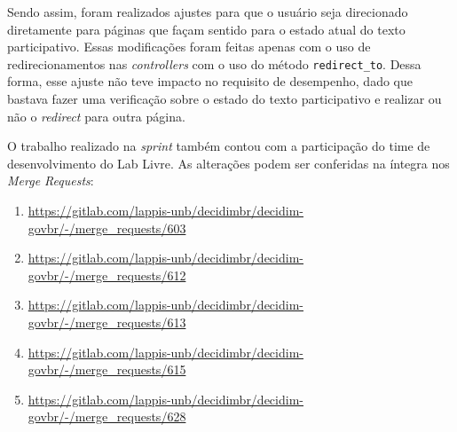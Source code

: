 Sendo assim, foram realizados ajustes para que o usuário seja direcionado diretamente para páginas que façam sentido para o estado atual do texto participativo. Essas modificações foram feitas apenas com o uso de redirecionamentos nas \textit{controllers} com o uso do método \texttt{redirect\_to}.
Dessa forma, esse ajuste não teve impacto no requisito de desempenho, dado que bastava fazer uma verificação sobre o estado do texto participativo e realizar ou não o \textit{redirect} para outra página.

O trabalho realizado na \textit{sprint} também contou com a participação do time de desenvolvimento do Lab Livre. As alterações podem ser conferidas na íntegra nos \textit{Merge Requests}:

\begin{enumerate}
  \item \url{https://gitlab.com/lappis-unb/decidimbr/decidim-govbr/-/merge_requests/603}
  \item \url{https://gitlab.com/lappis-unb/decidimbr/decidim-govbr/-/merge_requests/612}
  \item \url{https://gitlab.com/lappis-unb/decidimbr/decidim-govbr/-/merge_requests/613}
  \item \url{https://gitlab.com/lappis-unb/decidimbr/decidim-govbr/-/merge_requests/615}
  \item \url{https://gitlab.com/lappis-unb/decidimbr/decidim-govbr/-/merge_requests/628}
\end{enumerate}
